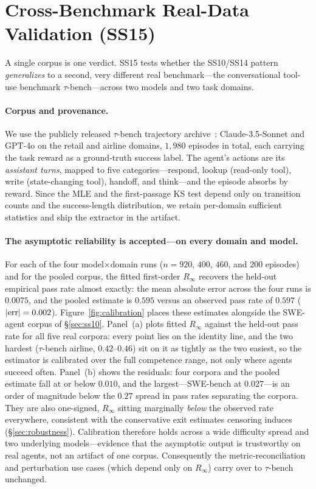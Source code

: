 \section{Cross-Benchmark Real-Data Validation (SS15)}
\label{sec:ss15}

A single corpus is one verdict. SS15 tests whether the SS10/SS14 pattern
\emph{generalizes} to a second, very different real benchmark---the
conversational tool-use benchmark $\tau$-bench---across two models and two
task domains.

\paragraph{Corpus and provenance.}
We use the publicly released $\tau$-bench trajectory
archive~\cite{taub2024}: Claude-3.5-Sonnet and GPT-4o on the retail and
airline domains, $1{,}980$ episodes in total, each carrying the task reward as
a ground-truth success label. The agent's actions are its \emph{assistant
turns}, mapped to five categories---respond, lookup (read-only tool), write
(state-changing tool), handoff, and think---and the episode absorbs by reward.
Since the MLE and the first-passage KS test depend only on transition counts
and the success-length distribution, we retain per-domain sufficient statistics
and ship the extractor in the artifact.

\paragraph{The asymptotic reliability is accepted---on every domain and model.}
For each of the four model$\times$domain runs
($n = 920$, $400$, $460$, and $200$ episodes) and for the pooled corpus, the
fitted first-order $R_\infty$ recovers the held-out empirical pass rate almost
exactly: the mean absolute error across the four runs is $0.0075$, and the
pooled estimate is $0.595$ versus an observed pass rate of $0.597$
($|{\rm err}|=0.002$). Figure~\ref{fig:calibration} places these estimates
alongside the SWE-agent corpus of \S\ref{sec:ss10}. Panel~(a) plots fitted
$R_\infty$ against the held-out pass rate for all five real corpora: every
point lies on the identity line, and the two hardest ($\tau$-bench airline,
$0.42$--$0.46$) sit on it as tightly as the two easiest, so the estimator is
calibrated over the full competence range, not only where agents succeed
often. Panel~(b) shows the residuals: four corpora and the pooled estimate
fall at or below $0.010$, and the largest---SWE-bench at $0.027$---is an order
of magnitude below the $0.27$ spread in pass rates separating the corpora.
They are also one-signed, $R_\infty$ sitting marginally \emph{below} the
observed rate everywhere, consistent with the conservative exit estimates
censoring induces (\S\ref{sec:robustness}). Calibration therefore holds across
a wide difficulty spread and two underlying models---evidence that the
asymptotic output is trustworthy on real agents, not an artifact of one
corpus. Consequently the
metric-reconciliation and perturbation use cases (which depend only on
$R_\infty$) carry over to $\tau$-bench unchanged.

